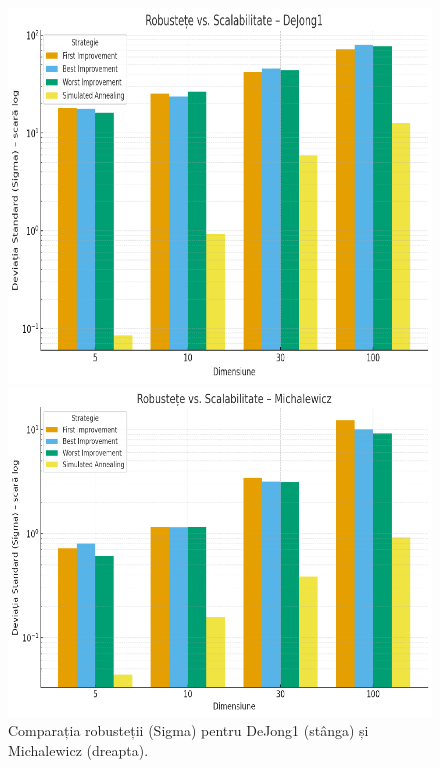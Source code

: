 \documentclass[
]{article}
\begin{document}
\begin{figure}[htbp]
	\centering
	
	\begin{minipage}{0.48\textwidth}
		\centering
		\includegraphics[width=\textwidth]{vertopal_3cc9e404d6084a9aa4179e4b559e5481/media/image6.png}
	\end{minipage}
	\hfill %
	\begin{minipage}{0.48\textwidth}
		\centering
		\includegraphics[width=\textwidth]{vertopal_3cc9e404d6084a9aa4179e4b559e5481/media/image7.png}
	\end{minipage}
	
	\caption{Comparația robusteții (Sigma) pentru DeJong1 (stânga) și Michalewicz (dreapta).}
	\label{fig:robustete-dejong-michal}
\end{figure}
\end{document}
